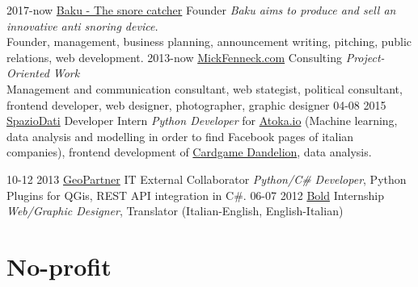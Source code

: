 \documentclass[]{friggeri-cv}
\begin{document}
\begin{entrylist}
\entry
    {2017-now}
    {\href{http://snorecatcher.it/it/benvenuti.html}{Baku - The snore catcher}}
    {Founder}
    {\emph{Baku aims to produce and sell an innovative anti snoring device.}\\
    {Founder, management, business planning, announcement writing, pitching, public relations, web development.}
    }
\entry
    {2013-now}
    {\href{http://www.mickfenneck.com}{MickFenneck.com}}
    {Consulting}
    {\emph{Project-Oriented Work}\\
    {Management and communication consultant, web stategist, political consultant, frontend developer, web designer, photographer, graphic designer}
    }
\entry
    {04-08 2015}
    {\href{https://spaziodati.eu/en/}{SpazioDati}}
    {Developer Intern}
    {\emph{Python Developer} for \href{https://atoka.io/en/}{Atoka.io} (Machine learning, data analysis and modelling in order to find Facebook pages of italian companies), frontend development of \href{http://cardgame.dandelion.eu}{Cardgame Dandelion}, data analysis.
    }
\end{entrylist}
\begin{entrylist}
\entry
    {10-12 2013}
    {\href{http://www.geopartner.it}{GeoPartner}}
    {IT External Collaborator}
    {\emph{Python/C\# Developer}, Python Plugins for QGis, REST API integration in C\#.
    }
\entry
    {06-07 2012}
    {\href{http://www.studiobold.it}{Bold}}
    {Internship}
    {\emph{Web/Graphic Designer}, Translator (Italian-English, English-Italian)}
\end{entrylist}



\section{No-profit}
\end{document}
